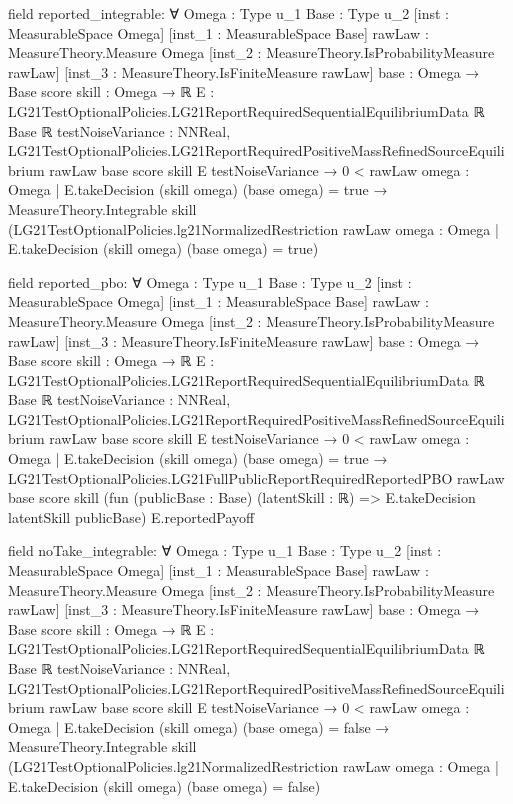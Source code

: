 \documentclass[10pt]{article}
\begin{document}
\begin{ReviewVerbatim}
field reported_integrable:
∀ {Omega : Type u_1} {Base : Type u_2} [inst : MeasurableSpace Omega] [inst_1 : MeasurableSpace Base]
  {rawLaw : MeasureTheory.Measure Omega} [inst_2 : MeasureTheory.IsProbabilityMeasure rawLaw]
  [inst_3 : MeasureTheory.IsFiniteMeasure rawLaw] {base : Omega → Base} {score skill : Omega → ℝ}
  {E : LG21TestOptionalPolicies.LG21ReportRequiredSequentialEquilibriumData ℝ Base ℝ} {testNoiseVariance : NNReal},
  LG21TestOptionalPolicies.LG21ReportRequiredPositiveMassRefinedSourceEquilibrium rawLaw base score skill E
      testNoiseVariance →
    0 < rawLaw {omega : Omega | E.takeDecision (skill omega) (base omega) = true} →
      MeasureTheory.Integrable skill
        (LG21TestOptionalPolicies.lg21NormalizedRestriction rawLaw
          {omega : Omega | E.takeDecision (skill omega) (base omega) = true})

field reported_pbo:
∀ {Omega : Type u_1} {Base : Type u_2} [inst : MeasurableSpace Omega] [inst_1 : MeasurableSpace Base]
  {rawLaw : MeasureTheory.Measure Omega} [inst_2 : MeasureTheory.IsProbabilityMeasure rawLaw]
  [inst_3 : MeasureTheory.IsFiniteMeasure rawLaw] {base : Omega → Base} {score skill : Omega → ℝ}
  {E : LG21TestOptionalPolicies.LG21ReportRequiredSequentialEquilibriumData ℝ Base ℝ} {testNoiseVariance : NNReal},
  LG21TestOptionalPolicies.LG21ReportRequiredPositiveMassRefinedSourceEquilibrium rawLaw base score skill E
      testNoiseVariance →
    0 < rawLaw {omega : Omega | E.takeDecision (skill omega) (base omega) = true} →
      LG21TestOptionalPolicies.LG21FullPublicReportRequiredReportedPBO rawLaw base score skill
        (fun (publicBase : Base) (latentSkill : ℝ) => E.takeDecision latentSkill publicBase) E.reportedPayoff

field noTake_integrable:
∀ {Omega : Type u_1} {Base : Type u_2} [inst : MeasurableSpace Omega] [inst_1 : MeasurableSpace Base]
  {rawLaw : MeasureTheory.Measure Omega} [inst_2 : MeasureTheory.IsProbabilityMeasure rawLaw]
  [inst_3 : MeasureTheory.IsFiniteMeasure rawLaw] {base : Omega → Base} {score skill : Omega → ℝ}
  {E : LG21TestOptionalPolicies.LG21ReportRequiredSequentialEquilibriumData ℝ Base ℝ} {testNoiseVariance : NNReal},
  LG21TestOptionalPolicies.LG21ReportRequiredPositiveMassRefinedSourceEquilibrium rawLaw base score skill E
      testNoiseVariance →
    0 < rawLaw {omega : Omega | E.takeDecision (skill omega) (base omega) = false} →
      MeasureTheory.Integrable skill
        (LG21TestOptionalPolicies.lg21NormalizedRestriction rawLaw
          {omega : Omega | E.takeDecision (skill omega) (base omega) = false})


\end{ReviewVerbatim}
\end{document}
